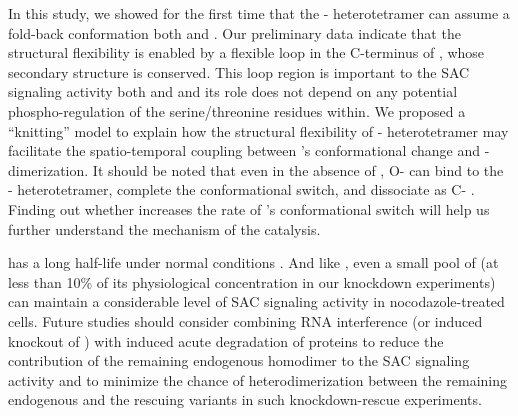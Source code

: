 In this study, we showed for the first time that the - heterotetramer can assume a fold-back conformation both  and . Our preliminary data indicate that the structural flexibility is enabled by a flexible loop in the C-terminus of , whose secondary structure is conserved. This loop region is important to the SAC signaling activity both  and  and its role does not depend on any potential phospho-regulation of the serine/threonine residues within. We proposed a ``knitting'' model to explain how the structural flexibility of - heterotetramer may facilitate the spatio-temporal coupling between 's conformational change and - dimerization. It should be noted that even in the absence of , O- can bind to the - heterotetramer, complete the conformational switch, and dissociate as C-  \cite{Yang2008}. Finding out whether  increases the rate of 's conformational switch will help us further understand the mechanism of the catalysis.

 has a long half-life under normal conditions \cite{MAD1MAD2Half-life}. And like  \cite{Raaijmakers2018, RZZ-MAD1vsBUB1-MAD1_2018, siROD_Zhang2019}, even a small pool of  (at less than 10\% of its physiological concentration in our knockdown experiments) can maintain a considerable level of SAC signaling activity in nocodazole-treated cells. Future studies should consider combining RNA interference (or induced knockout of ) with induced acute degradation of  proteins to reduce the contribution of the remaining endogenous  homodimer to the SAC signaling activity and to minimize the chance of heterodimerization between the remaining endogenous  and the rescuing  variants in such knockdown-rescue experiments. %

